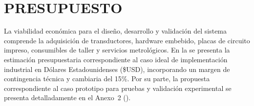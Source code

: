 \newpage
\section{PRESUPUESTO}

La viabilidad económica para el diseño, desarrollo y validación del sistema comprende la adquisición de transductores, hardware embebido, placas de circuito impreso, consumibles de taller y servicios metrológicos. En la  se presenta la estimación presupuestaria correspondiente al caso ideal de implementación industrial en Dólares Estadounidenses (\$USD), incorporando un margen de contingencia técnica y cambiaria del 15\%. Por su parte, la propuesta correspondiente al caso prototipo para pruebas y validación experimental se presenta detalladamente en el Anexo~2 ().


